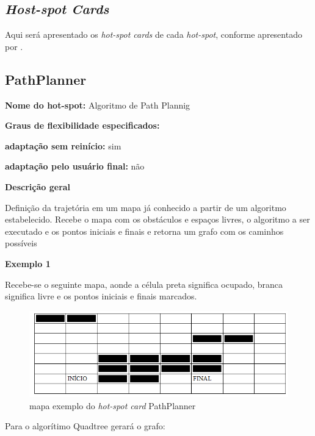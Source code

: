 \begin{anexosenv}

\partanexos

\chapter{\textit{Host-spot Cards}}

Aqui será apresentado os \textit{hot-spot cards} de cada \textit{hot-spot}, conforme apresentado por \cite{Fayad1999}.

\section{PathPlanner}

{\large \textbf{Nome do hot-spot:}} Algoritmo de Path Plannig

{\large \textbf{Graus de flexibilidade especificados:}}

\textbf{adaptação sem reinício:} sim

\textbf{adaptação pelo usuário final:} não

{\large \textbf{Descrição geral}}

Definição da trajetória em um mapa já conhecido a partir de um algoritmo estabelecido. Recebe o mapa com os obstáculos e espaços livres, o algoritmo a ser executado e os pontos iniciais e finais e retorna um grafo com os caminhos possíveis

{\large \textbf{Exemplo 1}}

Recebe-se o seguinte mapa, aonde a célula preta significa ocupado, branca significa livre e os pontos iniciais e finais marcados.

\begin{figure}[H]
	\centering
	\label{figXX}
		\includegraphics[keepaspectratio=true,scale=0.7]{figuras/mapahotspot1.PNG}
	\caption{mapa exemplo do \textit{hot-spot card} PathPlanner}
\end{figure}

Para o algorítimo Quadtree gerará o grafo:


\end{anexosenv}
